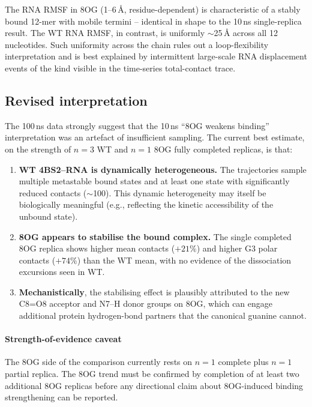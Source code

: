 \documentclass[11pt,a4paper]{article}
\begin{document}
The RNA RMSF in 8OG (1--6\,\si{\angstrom}, residue-dependent) is
characteristic of a stably bound 12-mer with mobile termini --
identical in shape to the 10\,ns single-replica result. The WT RNA
RMSF, in contrast, is uniformly $\sim$25\,\si{\angstrom} across all
12 nucleotides. Such uniformity across the chain rules out a
loop-flexibility interpretation and is best explained by intermittent
large-scale RNA displacement events of the kind visible in the
time-series total-contact trace.

\subsection{Revised interpretation}
\label{sec:revised}

The 100\,ns data strongly suggest that the 10\,ns ``8OG weakens
binding'' interpretation was an artefact of insufficient sampling.
The current best estimate, on the strength of $n=3$ WT and $n=1$ 8OG
fully completed replicas, is that:

\begin{enumerate}[leftmargin=*]
\item \textbf{WT 4BS2--RNA is dynamically heterogeneous.} The
trajectories sample multiple metastable bound states and at least one
state with significantly reduced contacts ($\sim$100). This dynamic
heterogeneity may itself be biologically meaningful (e.g., reflecting
the kinetic accessibility of the unbound state).
\item \textbf{8OG appears to stabilise the bound complex.} The single
completed 8OG replica shows higher mean contacts ($+21\%$) and higher
G3 polar contacts ($+74\%$) than the WT mean, with no evidence of
the dissociation excursions seen in WT.
\item \textbf{Mechanistically}, the stabilising effect is plausibly
attributed to the new C8=O8 acceptor and N7--H donor groups on 8OG,
which can engage additional protein hydrogen-bond partners that the
canonical guanine cannot.
\end{enumerate}

\paragraph{Strength-of-evidence caveat}
The 8OG side of the comparison currently rests on $n=1$ complete plus
$n=1$ partial replica. The 8OG trend must be confirmed by completion
of at least two additional 8OG replicas before any directional claim
about 8OG-induced binding strengthening can be reported.
\end{document}
